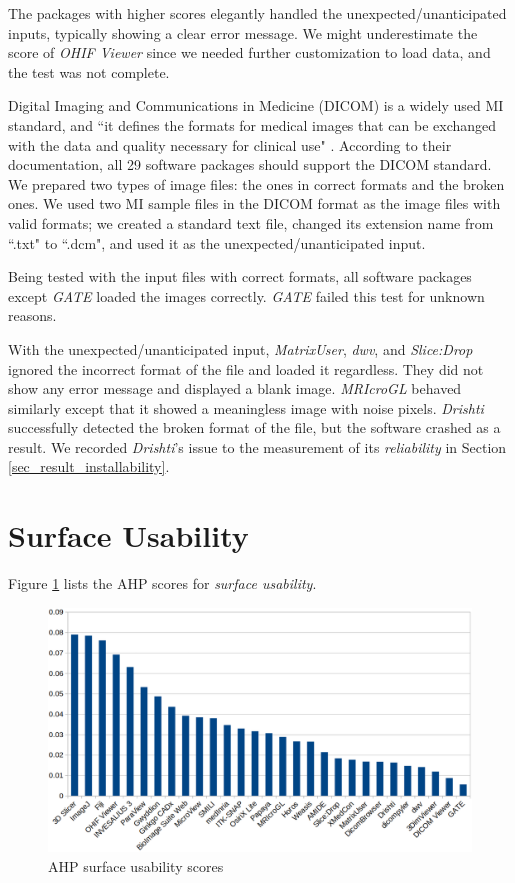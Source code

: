 The packages with higher scores elegantly handled the unexpected/unanticipated inputs, typically showing a clear error message. We might underestimate the score of \textit{OHIF Viewer} since we needed further customization to load data, and the test was not complete.

Digital Imaging and Communications in Medicine (DICOM) is a widely used MI standard, and ``it defines the formats for medical images that can be exchanged with the data and quality necessary for clinical use" \cite{MITA2021}. According to their documentation, all 29 software packages should support the DICOM standard. We prepared two types of image files: the ones in correct formats and the broken ones. We used two MI sample files in the DICOM format as the image files with valid formats; we created a standard text file, changed its extension name from ``.txt" to ``.dcm", and used it as the unexpected/unanticipated input.

Being tested with the input files with correct formats, all software packages except \textit{GATE} loaded the images correctly. \textit{GATE} failed this test for unknown reasons.

With the unexpected/unanticipated input, \textit{MatrixUser}, \textit{dwv}, and \textit{Slice:Drop} ignored the incorrect format of the file and loaded it regardless. They did not show any error message and displayed a blank image. \textit{MRIcroGL} behaved similarly except that it showed a meaningless image with noise pixels. \textit{Drishti} successfully detected the broken format of the file, but the software crashed as a result. We recorded \textit{Drishti}'s issue to the measurement of its \textit{reliability} in Section \ref{sec_result_installability}.

\section{Surface Usability}
\label{sec_result_usability}
Figure \ref{fg_usability_scores} lists the AHP scores for \textit{surface usability}.

\begin{figure}[H]
\includegraphics[scale=0.38]{figures/usability_scores.png}
\caption{AHP surface usability scores}
\label{fg_usability_scores}
\end{figure}

